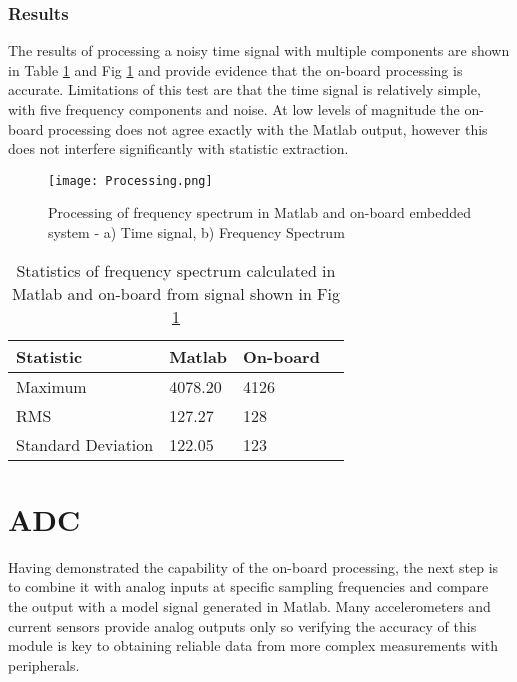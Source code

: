 \subsubsection{Results}

The results of processing a noisy time signal with multiple components are shown in Table \ref{tab:processing} and Fig \ref{fig:processing} and provide evidence that the on-board processing is accurate.
Limitations of this test are that the time signal is relatively simple, with five frequency components and noise.
At low levels of magnitude the on-board processing does not agree exactly with the Matlab output, however this does not interfere significantly with statistic extraction.

\begin{figure}
    \centering
    \texttt{[image: Processing.png]}
    \caption{Processing of frequency spectrum in Matlab and on-board embedded system - a) Time signal, b) Frequency Spectrum}
    \label{fig:processing}
\end{figure}

\begin{table}
	\begin{center}
		\begin{tabular}{llll}%
			\toprule
			\textbf{Statistic}  & \textbf{Matlab} & \textbf{On-board}\\
			\midrule
			Maximum & 4078.20 & 4126 \\
			RMS & 127.27 & 128 \\
			Standard Deviation & 122.05 & 123  \\
			\bottomrule
		\end{tabular}
		\caption{Statistics of frequency spectrum calculated in Matlab and on-board from signal shown in Fig \ref{fig:processing}}
		\label{tab:processing}%
	\end{center}
\end{table}

\section{ADC}

Having demonstrated the capability of the on-board processing, the next step is to combine it with analog inputs at specific sampling frequencies and compare the output with a model signal generated in Matlab.
Many accelerometers and current sensors provide analog outputs only so verifying the accuracy of this module is key to obtaining reliable data from more complex measurements with peripherals.
\par

